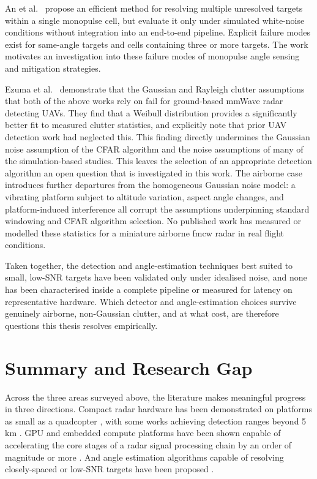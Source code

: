 An et al.\
\cite{an2024_time_varying_angle_estimation_unresolved_extended_targets_monopulse}
propose an efficient method for resolving multiple unresolved targets
within a single monopulse cell, but evaluate it only under simulated
white-noise conditions without integration into an end-to-end pipeline.
Explicit failure modes exist for same-angle targets and cells containing
three or more targets. The work motivates an investigation into these
failure modes of monopulse angle sensing and mitigation strategies.

Ezuma et al.\ \cite{ezuma2019microuav} demonstrate that the Gaussian and
Rayleigh clutter assumptions that both of the above works rely on fail
for ground-based mmWave radar detecting UAVs. They find that a Weibull
distribution provides a significantly better fit to measured clutter
statistics, and explicitly note that prior UAV detection work had
neglected this. This finding directly undermines the Gaussian noise
assumption of the CFAR algorithm and the noise assumptions of many of
the simulation-based studies. This leaves the selection of an appropriate
detection algorithm an open question that is investigated in this work.
The airborne case introduces further departures from the homogeneous
Gaussian noise model: a vibrating platform subject to altitude variation,
aspect angle changes, and platform-induced interference all corrupt the
assumptions underpinning standard windowing and CFAR algorithm selection.
No published work has measured or modelled these statistics for a
miniature airborne \gls{fmcw} radar in real flight conditions.

Taken together, the detection and angle-estimation techniques best suited
to small, low-SNR targets have been validated only under idealised noise,
and none has been characterised inside a complete pipeline or measured for
latency on representative hardware. Which detector and angle-estimation
choices survive genuinely airborne, non-Gaussian clutter, and at what cost,
are therefore questions this thesis resolves empirically.

\section{Summary and Research Gap}

Across the three areas surveyed above, the literature makes meaningful
progress in three directions. Compact radar hardware has been demonstrated on
platforms as small as a quadcopter \cite{6044363, Moses2014}, with some works
achieving detection ranges beyond 5 km \cite{Wang2016}. GPU and embedded
compute platforms have been shown capable of accelerating the core stages of a
radar signal processing chain by an order of magnitude or more
\cite{Fang2024, rs15225421, Mondal2024_gpu_radar}. And angle estimation
algorithms capable of resolving closely-spaced or low-SNR targets have been
proposed \cite{an2024_time_varying_angle_estimation_unresolved_extended_targets_monopulse,
aubry2020_single_pulse_simultaneous_detection_angle_estimation_multichannel}.

